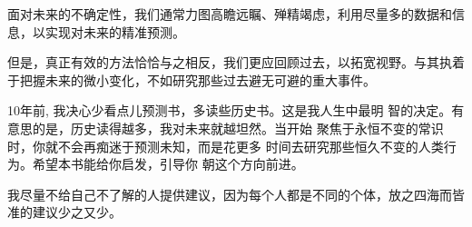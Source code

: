 %
%
%
%
%
%
%
%
%


面对未来的不确定性，我们通常力图高瞻远瞩、殚精竭虑，利用尽量多的数据和信息，以实现对未来的精准预测。

但是，真正有效的方法恰恰与之相反，我们更应回顾过去，以拓宽视野。与其执着于把握未来的微小变化，不如研究那些过去避无可避的重大事件。

10年前, 我决心少看点儿预测书，多读些历史书。这是我人生中最明 智的决定。有意思的是，历史读得越多，我对未来就越坦然。当开始 聚焦于永恒不变的常识时，你就不会再痴迷于预测未知，而是花更多 时间去研究那些恒久不变的人类行为。希望本书能给你启发，引导你 朝这个方向前进。

我尽量不给自己不了解的人提供建议，因为每个人都是不同的个体，放之四海而皆准的建议少之又少。

\newpage

\nocite{*}
\printbibliography[heading=bibintoc, title=\ebibname]

